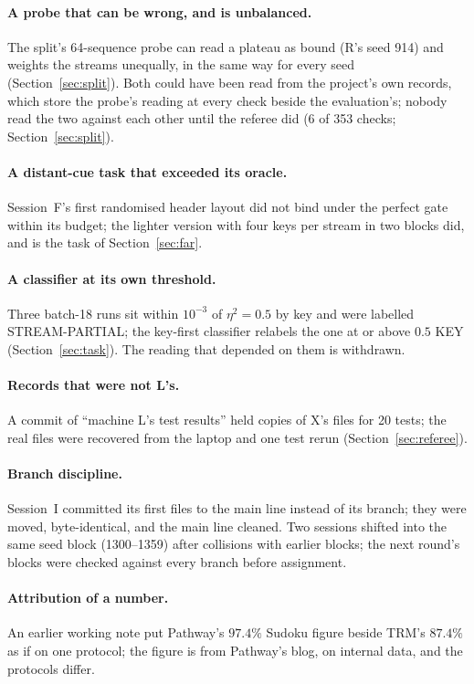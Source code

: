 \documentclass[11pt]{article}
\begin{document}
\paragraph{A probe that can be wrong, and is unbalanced.} The split's 64-sequence probe can read a plateau as bound (R's seed 914) and weights the streams unequally, in the same way for every seed (Section~\ref{sec:split}). Both could have been read from the project's own records, which store the probe's reading at every check beside the evaluation's; nobody read the two against each other until the referee did (6 of 353 checks; Section~\ref{sec:split}).

\paragraph{A distant-cue task that exceeded its oracle.} Session~F's first randomised header layout did not bind under the perfect gate within its budget; the lighter version with four keys per stream in two blocks did, and is the task of Section~\ref{sec:far}.

\paragraph{A classifier at its own threshold.} Three batch-18 runs sit within $10^{-3}$ of $\eta^2 = 0.5$ by key and were labelled STREAM-PARTIAL; the key-first classifier relabels the one at or above $0.5$ KEY (Section~\ref{sec:task}). The reading that depended on them is withdrawn.

\paragraph{Records that were not L's.} A commit of ``machine L's test results'' held copies of X's files for 20 tests; the real files were recovered from the laptop and one test rerun (Section~\ref{sec:referee}).

\paragraph{Branch discipline.} Session~I committed its first files to the main line instead of its branch; they were moved, byte-identical, and the main line cleaned. Two sessions shifted into the same seed block (1300--1359) after collisions with earlier blocks; the next round's blocks were checked against every branch before assignment.

\paragraph{Attribution of a number.} An earlier working note put Pathway's $97.4\%$ Sudoku figure beside TRM's $87.4\%$ as if on one protocol; the figure is from Pathway's blog, on internal data, and the protocols differ.
\end{document}
